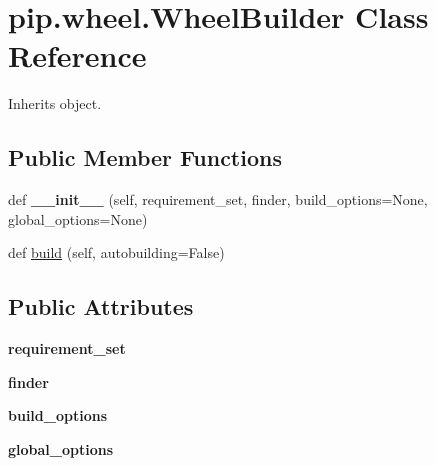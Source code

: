 \hypertarget{classpip_1_1wheel_1_1_wheel_builder}{}\section{pip.\+wheel.\+Wheel\+Builder Class Reference}
\label{classpip_1_1wheel_1_1_wheel_builder}


Inherits object.

\subsection*{Public Member Functions}
\begin{DoxyCompactItemize}
\item 
\mbox{\label{classpip_1_1wheel_1_1_wheel_builder_a5e73fc4c2432883d812a414c6c3edbd9}} 
def {\bfseries \+\_\+\+\_\+init\+\_\+\+\_\+} (self, requirement\+\_\+set, finder, build\+\_\+options=None, global\+\_\+options=None)
\item 
def \hyperlink{classpip_1_1wheel_1_1_wheel_builder_a7dcc1d58cea783d03347132deb3b11fd}{build} (self, autobuilding=False)
\end{DoxyCompactItemize}
\subsection*{Public Attributes}
\begin{DoxyCompactItemize}
\item 
\mbox{\label{classpip_1_1wheel_1_1_wheel_builder_a8d3299b70a68522c92e457219a71c922}} 
{\bfseries requirement\+\_\+set}
\item 
\mbox{\label{classpip_1_1wheel_1_1_wheel_builder_a6f1911086002e760e4af2a127485fbe1}} 
{\bfseries finder}
\item 
\mbox{\label{classpip_1_1wheel_1_1_wheel_builder_ab92660a2fc8773d26d86ef742bd215d6}} 
{\bfseries build\+\_\+options}
\item 
\mbox{\label{classpip_1_1wheel_1_1_wheel_builder_af83690fac612da0ca09a3ee34174b6fc}} 
{\bfseries global\+\_\+options}
\end{DoxyCompactItemize}


